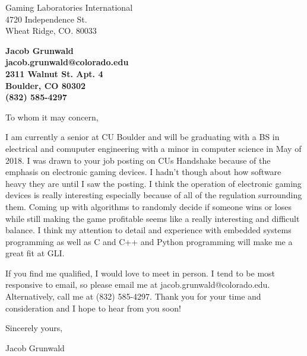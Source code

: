 \documentclass[11pt]{letter} %
\begin{document}

\begin{letter}{
Gaming Laboratories International \\
4720 Independence St. \\
Wheat Ridge, CO. 80033}


\begin{center}
\large\bf Jacob Grunwald \\ jacob.grunwald@colorado.edu \\
2311 Walnut St. Apt. 4 \\ Boulder, CO 80302 \\ (832) 585-4297 %
\end{center}
\vfill



\opening{To whom it may concern,}

I am currently a senior at CU Boulder and will be graduating with a BS in electrical and comuputer engineering with a minor in computer science in May of 2018. I was drawn to your job posting on CUs Handshake because of the emphasis on electronic gaming devices. I hadn't though about how software heavy they are until I saw the posting. I think the operation of electronic gaming devices is really interesting especially because of all of the regulation surrounding them. Coming up with algorithms to randomly decide if someone wins or loses while still making the game profitable seems like a really interesting and difficult balance. I think my attention to detail and experience with embedded systems programming as well as C and C++ and Python programming will make me a great fit at GLI.

If you find me qualified, I would love to meet in person. I tend to be most responsive to email, so please email me at jacob.grunwald@colorado.edu. Alternatively, call me at (832) 585-4297. Thank you for your time and consideration and I hope to hear from you soon!

Sincerely yours,

Jacob Grunwald


\end{letter}
\end{document}

